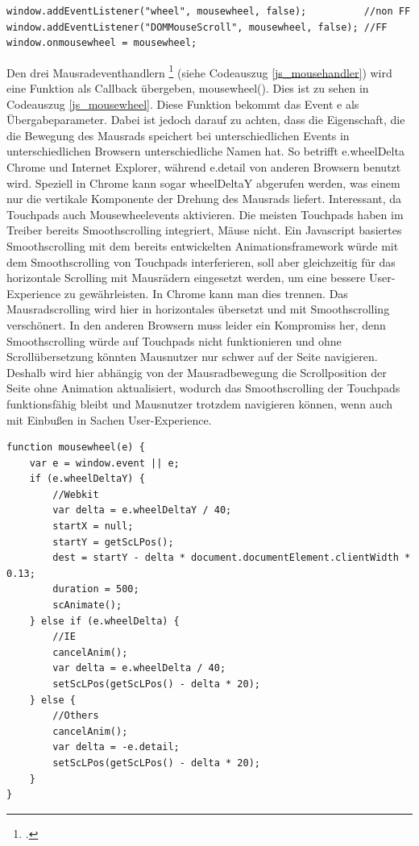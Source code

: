  \begin{lstlisting}[caption=Die unterschiedlichen Eventhandler des Mausrads., label=js_mousehandler]
window.addEventListener("wheel", mousewheel, false);          //non FF
window.addEventListener("DOMMouseScroll", mousewheel, false); //FF
window.onmousewheel = mousewheel;
\end{lstlisting} 

Den drei Mausradeventhandlern  \footcite[vgl.][]{jsMousewheel} (siehe Codeauszug \ref{js_mousehandler}) wird eine Funktion als Callback übergeben, mousewheel(). Dies ist zu sehen in Codeauszug \ref{js_mousewheel}. Diese Funktion bekommt das Event e als Übergabeparameter. Dabei ist jedoch darauf zu achten, dass die Eigenschaft, die die Bewegung des Mausrads speichert bei unterschiedlichen Events in unterschiedlichen Browsern unterschiedliche Namen hat. So betrifft e.wheelDelta Chrome und Internet Explorer, während e.detail von anderen Browsern benutzt wird. Speziell in Chrome kann sogar wheelDeltaY abgerufen werden, was einem nur die vertikale Komponente der Drehung des Mausrads liefert. Interessant, da Touchpads auch Mousewheelevents aktivieren. Die meisten Touchpads haben im Treiber bereits Smoothscrolling integriert, Mäuse nicht. Ein Javascript basiertes Smoothscrolling mit dem bereits entwickelten Animationsframework würde mit dem Smoothscrolling von Touchpads interferieren, soll aber gleichzeitig für das horizontale Scrolling mit Mausrädern eingesetzt werden, um eine bessere User-Experience zu gewährleisten. In Chrome kann man dies trennen. Das Mausradscrolling wird hier in horizontales übersetzt und mit Smoothscrolling verschönert. In den anderen Browsern muss leider ein Kompromiss her, denn Smoothscrolling würde auf Touchpads nicht funktionieren und ohne Scrollübersetzung könnten Mausnutzer nur schwer auf der Seite navigieren. Deshalb wird hier abhängig von der Mausradbewegung die Scrollposition der Seite ohne Animation aktualisiert, wodurch das Smoothscrolling der Touchpads funktionsfähig bleibt und Mausnutzer trotzdem navigieren können, wenn auch mit Einbußen in Sachen User-Experience.

 \begin{lstlisting}[caption=Die Funktion mousewheel() regelt die Verarbeitung des Mausraddelta., label=js_mousewheel]
function mousewheel(e) {
	var e = window.event || e;
	if (e.wheelDeltaY) {
		//Webkit
		var delta = e.wheelDeltaY / 40;
		startX = null;
		startY = getScLPos();
		dest = startY - delta * document.documentElement.clientWidth * 0.13;
		duration = 500;
		scAnimate();
	} else if (e.wheelDelta) {
		//IE
		cancelAnim();
		var delta = e.wheelDelta / 40;
		setScLPos(getScLPos() - delta * 20);
	} else {
		//Others
		cancelAnim();
		var delta = -e.detail;
		setScLPos(getScLPos() - delta * 20);
	}
}
\end{lstlisting} 

